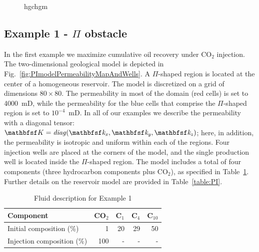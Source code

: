 \begin{figure}[htb]
\begin {tabular}{@{}cccc@{}}
\end {tabular}
\caption {hgchgm}

 \end{figure}



\subsection{Example 1 - $\Pi$ obstacle}

In the first example we maximize cumulative oil recovery under CO$_2$ injection. The two-dimensional geological model is depicted in Fig.~\ref{fig:PImodelPermeabilityMapAndWells}. A $\Pi$-shaped region is located at the center of a homogeneous reservoir. The model is discretized on a grid of dimensions $80\times80$. The permeability in most of the domain (red cells) is set to 4000~mD, while the permeability for the blue cells that comprise the $\Pi$-shaped region is set to $10^{-4}$~mD. In all of our examples we describe the permeability with a diagonal tensor: $\tens{K} = \it{diag}(\tens{k}_x, \tens{k}_y, \tens{k}_z)$; here, in addition, the permeability is isotropic and uniform within each of the regions. Four injection wells are placed at the corners of the model, and the single production well is located inside the $\Pi$-shaped region. The model includes a total of four components (three hydrocarbon  components plus CO$_2$), as specified in Table~\ref{table:fluidForPImodel}. Further details on the reservoir model are provided in Table~\ref{table:PI}.

%
\begin{table}
\centering
\caption{Fluid description for Example 1}
\begin{tabular}{|l|r|r|r|r|}
\hline
Component            & CO$_2$ & C$_1$ & C$_4$ & C$_{10}$    \\
\hline
Initial composition (\%)  & 1    & 20  & 29    & 50 \\
Injection composition (\%)& 100   & - & - & - \\
\hline
\end{tabular}
\label{table:fluidForPImodel}
\end{table}
%

